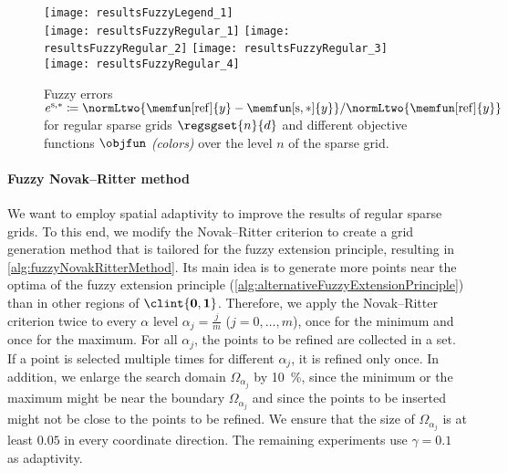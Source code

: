 \begin{figure}
  \texttt{[image: resultsFuzzyLegend\_1]}\\[2mm]%
  \texttt{[image: resultsFuzzyRegular\_1]}%
  \hfill%
  \texttt{[image: resultsFuzzyRegular\_2]}%
  \hfill%
  \texttt{[image: resultsFuzzyRegular\_3]}%
  \hfill%
  \texttt{[image: resultsFuzzyRegular\_4]}%
  \caption[Fuzzy errors for regular sparse grids]{%
    Fuzzy errors
    $e^{\sparse,\ast}
    \ceq \normLtwo{\memfun[\reference]{y} - \memfun[\sparse,\ast]{y}}/
    \normLtwo{\memfun[\reference]{y}}$
    for regular sparse grids $\regsgset{n}{d}$
    and different objective functions $\objfun$ \emph{(colors)}
    over the level $n$ of the sparse grid.%
  }%
  \label{fig:resultsFuzzyRegular}%
\end{figure}

\paragraph{Fuzzy Novak--Ritter method}

We want to employ spatial adaptivity to improve the results
of regular sparse grids.
To this end, we modify the Novak--Ritter criterion
to create a grid generation method that is tailored for the
fuzzy extension principle, resulting in \cref{alg:fuzzyNovakRitterMethod}.
Its main idea is to generate more points near the optima
of the fuzzy extension principle
(\cref{alg:alternativeFuzzyExtensionPrinciple}) than in other regions
of $\clint{\*0, \*1}$.
Therefore, we apply the Novak--Ritter criterion twice to
every $\alpha$ level $\alpha_j = \tfrac{j}{m}$ ($j = 0, \dotsc, m$),
once for the minimum and once for the maximum.
For all $\alpha_j$, the points to be refined are collected in a set.
If a point is selected multiple times for different $\alpha_j$,
it is refined only once.
In addition, we enlarge the search domain $\Omega_{\alpha_j}$
by \SI{10}{\percent}, since the minimum or the maximum might be
near the boundary $\Omega_{\alpha_j}$ and
since the points to be inserted might not be close to
the points to be refined.
We ensure that the size of $\Omega_{\alpha_j}$ is at least $0.05$
in every coordinate direction.
The remaining experiments use $\gamma = 0.1$ as adaptivity.

